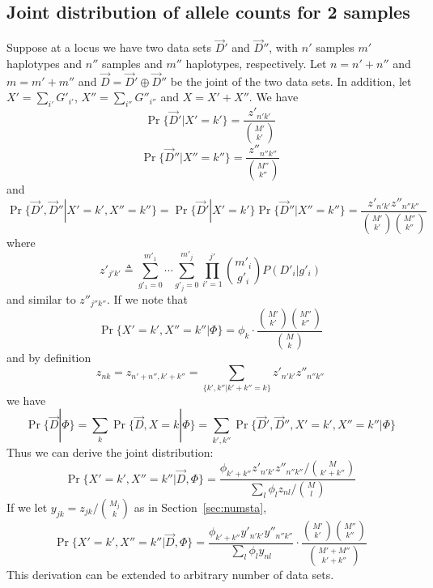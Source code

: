 \documentclass[pdftex,10pt]{book}
\begin{document}
\subsection{Joint distribution of allele counts for 2 samples}
Suppose at a locus we have two data sets $\vec{D}'$ and $\vec{D}''$,
with $n'$ samples $m'$ haplotypes and $n''$ samples and $m''$
haplotypes, respectively. Let $n=n'+n''$ and $m=m'+m''$ and
$\vec{D}=\vec{D}'\oplus\vec{D}''$ be the joint of the two data sets. In
addition, let $X'=\sum_{i'}G'_{i'}$, $X''=\sum_{i''}G''_{i''}$ and
$X=X'+X''$. We have
$$
\Pr\{\vec{D}'|X'=k'\}=\frac{z'_{n'k'}}{\binom{M'}{k'}}
$$
$$
\Pr\{\vec{D}''|X''=k''\}=\frac{z''_{n''k''}}{\binom{M''}{k''}}
$$
and
$$
\Pr\{\vec{D}',\vec{D}''|X'=k',X''=k''\}=\Pr\{\vec{D}'|X'=k'\}\Pr\{\vec{D}''|X''=k''\}=\frac{z'_{n'k'}z''_{n''k''}}{\binom{M'}{k'}\binom{M''}{k''}}
$$
where
$$
z'_{j'k'}\triangleq\sum_{g'_1=0}^{m'_1}\cdots\sum_{g'_j=0}^{m'_j}\prod_{i'=1}^{j'}\binom{m'_i}{g'_i}P(D'_i|g'_i)
$$
and similar to $z''_{j''k''}$. If we note that
$$
\Pr\{X'=k',X''=k''|\Phi\}=\phi_k\cdot\frac{\binom{M'}{k'}\binom{M''}{k''}}{\binom{M}{k}}
$$
and by definition
$$
z_{nk}=z_{n'+n'',k'+k''}=\sum_{\{k',k''|k'+k''=k\}}z'_{n'k'}z''_{n''k''}
$$
we have
$$
\Pr\{\vec{D}|\Phi\}=\sum_k\Pr\{\vec{D},X=k|\Phi\}=\sum_{k',k''}\Pr\{\vec{D}',\vec{D}'',X'=k',X''=k''|\Phi\}
$$
Thus we can derive the joint distribution:
\begin{equation}
\Pr\{X'=k',X''=k''|\vec{D},\Phi\}=\frac{\phi_{k'+k''}z'_{n'k'}z''_{n''k''}\big/\binom{M}{k'+k''}}{\sum_l\phi_lz_{nl}\big/\binom{M}{l}}
\end{equation}
If we let $y_{jk}=z_{jk}/\binom{M_j}{k}$ as in Section~\ref{sec:numsta},
$$
\Pr\{X'=k',X''=k''|\vec{D},\Phi\}=\frac{\phi_{k'+k''}y'_{n'k'}y''_{n''k''}}{\sum_l\phi_ly_{nl}}\cdot\frac{\binom{M'}{k'}\binom{M''}{k''}}{\binom{M'+M''}{k'+k''}}
$$
This derivation can be extended to arbitrary number of data sets.
\end{document}
